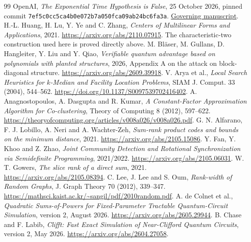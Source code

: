 \documentclass[11pt,a4paper]{article}
\begin{document}
\begin{thebibliography}{99}\small
{} OpenAI,
\emph{The Exponential Time Hypothesis is False}, 25 October 2026,
pinned commit \texttt{7ef5c0cc5ca4b0e072b7a050fca09ab24bc6fa3a}.
\href{https://github.com/openai/math/blob/7ef5c0cc5ca4b0e072b7a050fca09ab24bc6fa3a/preprints/The-Exponential-Time-Hypothesis-is-False-October-25-2026/paper.pdf}{Governing manuscript}.
 H.-L. Huang, H. Lu, Y. Ye and C. Zhang,
\emph{Centers of Multilinear Forms and Applications}, 2021.
\url{https://arxiv.org/abs/2110.07915}.
The characteristic-two construction used here is proved directly above.
 M. Bl\"aser, M. Gullans, D. Hangleiter, Y. Liu and Y. Qiao,
\emph{Verifiable quantum advantage based on polynomials with planted structures},
2026, Appendix A on the attack on block-diagonal structure.
\url{https://arxiv.org/abs/2609.39918}.
 V. Arya et al.,
\emph{Local Search Heuristics for $k$-Median and Facility Location Problems},
SIAM J. Comput. 33 (2004), 544--562.
\url{https://doi.org/10.1137/S0097539702416402}.
 A. Anagnostopoulos, A. Dasgupta and R. Kumar,
\emph{A Constant-Factor Approximation Algorithm for Co-clustering},
Theory of Computing 8 (2012), 597--622.
\url{https://theoryofcomputing.org/articles/v008a026/v008a026.pdf}.
 G. N. Alfarano, F. J. Lobillo, A. Neri and A. Wachter-Zeh,
\emph{Sum-rank product codes and bounds on the minimum distance}, 2021.
\url{https://arxiv.org/abs/2105.15086}.
 Y. Fan, Y. Khoo and Z. Zhao,
\emph{Joint Community Detection and Rotational Synchronization via
Semidefinite Programming}, 2021/2022.
\url{https://arxiv.org/abs/2105.06031}.
 W. T. Gowers, \emph{The slice rank of a direct sum}, 2021.
\url{https://arxiv.org/abs/2105.08394}.
 C. Lee, J. Lee and S. Oum,
\emph{Rank-width of Random Graphs}, J. Graph Theory 70 (2012), 339--347.
\url{https://mathsci.kaist.ac.kr/~sangil/pdf/2010random.pdf}.
 A. de Colnet et al.,
\emph{Quadratic Sums-of-Powers for Fixed-Parameter Tractable
Quantum-Circuit Simulation}, version 2, August 2026.
\url{https://arxiv.org/abs/2605.29944}.
 B. Chase and F. Labib,
\emph{Clifft: Fast Exact Simulation of Near-Clifford Quantum Circuits},
version 2, May 2026. \url{https://arxiv.org/abs/2604.27058}.
\end{thebibliography}
\end{document}
